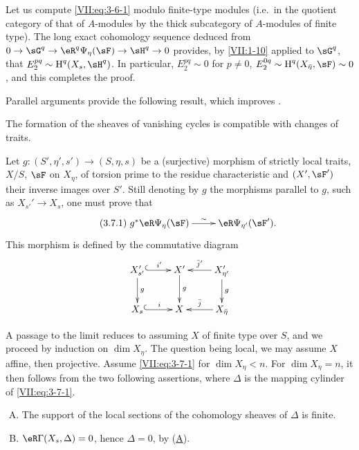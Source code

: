 Let us compute \eqref{VII:eq:3-6-1} modulo finite-type modules (i.e.\ in the
quotient category of that of $A$-modules by the thick subcategory
of $A$-modules of finite type). The long exact cohomology sequence deduced
from $0 \to \sG^q \to \eR^q\Psi_\eta(\sF) \to \sH^q \to 0$ provides, by
\ref{VII:1-10} applied to $\sG^q$, that $E_2^{p q} \sim \h^q(X_s,\sH^q)$.
In particular, $E_2^{p q}\sim 0$ for $p\ne 0$,
$E_2^{0 q}\sim \h^q(X_{\bar\eta},\sF) \sim 0$, and this completes the
proof.

Parallel arguments provide the following result, which improves
\cite[XIII 2.1.12, 2.4.2]{sga7}.




\begin{proposition_}\label{VII:3-7}
The formation of the sheaves of vanishing cycles is compatible with
changes of traits.
\end{proposition_}

Let $g:(S',\eta',s') \to (S,\eta,s)$ be a (surjective) morphism of strictly
local traits, $X/S$, $\sF$ on $X_\eta$, of torsion prime to the
residue characteristic and $(X',\sF')$ their inverse images over
$S'$. Still denoting by $g$ the morphisms parallel to $g$, such as
$X_{s'}' \to X_s$, one must prove that
\begin{equation*}\tag{3.7.1}\label{VII:eq:3-7-1}
\xymatrix{
  g^\ast \eR\Psi_\eta(\sF) \ar[r]^-\sim
    & \eR\Psi_{\eta'}(\sF') \text{.}
}
\end{equation*}
This morphism is defined by the commutative diagram
\[\xymatrix{
  X_{s'}' \ar@{^{(}->}[r]^-{i'} \ar[d]^-g
    & X' \ar[d]^-g
    & X_{\eta'}' \ar[l]_-{\bar j'} \ar[d]^-g \\
  X_s \ar@{^{(}->}[r]^-i
    & X
    & \ar[l]_-{\bar j} X_{\bar\eta}
}\]

A passage to the limit reduces to assuming $X$ of finite type over $S$, and we
proceed by induction on $\dim{X_\eta}$. The question being local, we
may assume $X$ affine, then projective. Assume \eqref{VII:eq:3-7-1} for
$\dim{X_\eta}<n$. For $\dim{X_\eta}=n$, it then follows from the two
following assertions, where $\Delta$ is the mapping cylinder of
\eqref{VII:eq:3-7-1}.

\begin{enumerate}[(A)]
  \item The support of the local sections of the cohomology sheaves of
    $\Delta$ is finite.
    \hypertarget{VII:3-A}{}
  \item $\eR\Gamma(X_s,\Delta)=0$, hence $\Delta=0$, by
    (\hyperlink{VII:3-A}{A}).
    \hypertarget{VII:3-B}{}
\end{enumerate}




